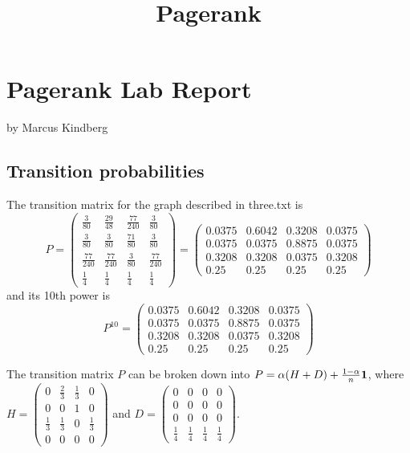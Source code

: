 \documentclass{tufte-handout}
\title{\sf Pagerank}
\begin{document}
\section{Pagerank Lab Report}


by Marcus Kindberg

\subsection{Transition probabilities}

The transition matrix for the graph described in three.txt
is
\begin{equation*}
P = 
\left(\begin{array}{cccc} \frac{3}{80} & \frac{29}{48} & \frac{77}{240} & \frac{3}{80}\\ \frac{3}{80} & \frac{3}{80} & \frac{71}{80} & \frac{3}{80}\\ \frac{77}{240} & \frac{77}{240} & \frac{3}{80} & \frac{77}{240}\\ \frac{1}{4} & \frac{1}{4} & \frac{1}{4} & \frac{1}{4} \end{array}\right) = \left(\begin{array}{cccc} 0.0375 & 0.6042 & 0.3208 & 0.0375\\ 0.0375 & 0.0375 & 0.8875 & 0.0375\\ 0.3208 & 0.3208 & 0.0375 & 0.3208\\ 0.25 & 0.25 & 0.25 & 0.25 \end{array}\right)
\end{equation*}
and its 10th power is
\begin{equation*}
P^{10} = 
\left(\begin{array}{cccc} 0.0375 & 0.6042 & 0.3208 & 0.0375\\ 0.0375 & 0.0375 & 0.8875 & 0.0375\\ 0.3208 & 0.3208 & 0.0375 & 0.3208\\ 0.25 & 0.25 & 0.25 & 0.25 \end{array}\right)
\end{equation*}

The transition matrix $P$ can be broken down into  $P = \alpha(H + D)
+ \frac{1-\alpha}{n} \bf 1$, where $H =\left(\begin{array}{cccc} 0 & \frac{2}{3} & \frac{1}{3} & 0\\ 0 & 0 & 1 & 0\\ \frac{1}{3} & \frac{1}{3} & 0 & \frac{1}{3}\\ 0 & 0 & 0 & 0 \end{array}\right)
$ and $D =\left(\begin{array}{cccc} 0 & 0 & 0 & 0\\ 0 & 0 & 0 & 0\\ 0 & 0 & 0 & 0\\ \frac{1}{4} & \frac{1}{4} & \frac{1}{4} & \frac{1}{4} \end{array}\right)
$.
\end{document}
